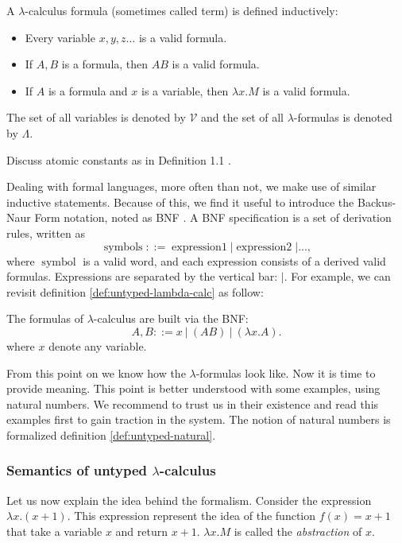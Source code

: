 \begin{definition}\label{def:untyped-lambda-calc}
  A $\lambda$-calculus formula (sometimes called term) is defined inductively:
  \begin{itemize}
  \item Every variable $x,y,z...$ is a valid formula.
  \item If $A,B$ is a formula, then $AB$ is a valid formula.
  \item If $A$ is a formula and $x$ is a variable, then $\lambda x.M$ is a valid formula.
  \end{itemize}
  The set of all variables is denoted by $\mathcal{V}$ and the set of all $\lambda$-formulas is denoted by $\Lambda$.\\
\end{definition}

{\color{red} Discuss atomic constants as in Definition 1.1 \cite{hindley2008lambda}.}

Dealing with formal languages, more often than not, we make use of similar inductive statements. Because of this, we find it useful to introduce the Backus-Naur Form notation, noted as BNF \cite{knuth1964backus}.  A BNF specification is a set of derivation rules, written as $$\operatorname{symbols} ::= \operatorname{expression1} | \operatorname{expression2} |...,$$ where $\operatorname{symbol}$ is a valid word, and each  expression consists of a derived valid formulas. Expressions are separated by the vertical bar: $|$. For example, we can revisit definition \ref{def:untyped-lambda-calc} as follow:

\begin{definition}
  The formulas of  $\lambda$-calculus are built via the BNF:
  $$A,B ::= x\ |\ (AB)\ |\ (\lambda x.A) .$$
  where $x$ denote any variable.
\end{definition}


From this point on we know how the $\lambda$-formulas look like. Now it is time to provide meaning. This point is better understood with some examples, using natural numbers.  We recommend to trust us in their existence and read this examples first to gain traction in the system. The notion of natural numbers is formalized definition \ref{def:untyped-natural}.\\


\subsubsection{Semantics of untyped $\lambda$-calculus}
Let us now explain the idea behind the formalism. Consider the expression $\lambda x.(x+1)$. This expression represent the idea of the function $f(x)=x+1$ that take a variable $x$ and return $x+1$. $\lambda x.M$ is called the \emph{abstraction} of $x$.\\

